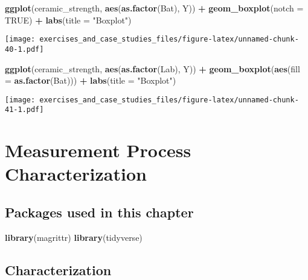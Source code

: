 \documentclass[]{book}
\newenvironment{Shaded}{\begin{snugshade}}{\end{snugshade}}
\newcommand{\DataTypeTok}[1]{\textcolor[rgb]{0.13,0.29,0.53}{#1}}
\newcommand{\KeywordTok}[1]{\textcolor[rgb]{0.13,0.29,0.53}{\textbf{#1}}}
\newcommand{\NormalTok}[1]{#1}
\newcommand{\OperatorTok}[1]{\textcolor[rgb]{0.81,0.36,0.00}{\textbf{#1}}}
\newcommand{\OtherTok}[1]{\textcolor[rgb]{0.56,0.35,0.01}{#1}}
\newcommand{\StringTok}[1]{\textcolor[rgb]{0.31,0.60,0.02}{#1}}
\theoremstyle{definition}
\theoremstyle{definition}
\theoremstyle{definition}
\theoremstyle{remark}
\begin{document}
\begin{Shaded}
\begin{Highlighting}[]
\KeywordTok{ggplot}\NormalTok{(ceramic_strength, }\KeywordTok{aes}\NormalTok{(}\KeywordTok{as.factor}\NormalTok{(Bat), Y)) }\OperatorTok{+}
\StringTok{  }\KeywordTok{geom_boxplot}\NormalTok{(}\DataTypeTok{notch =} \OtherTok{TRUE}\NormalTok{) }\OperatorTok{+}
\StringTok{  }\KeywordTok{labs}\NormalTok{(}\DataTypeTok{title =} \StringTok{"Boxplot"}\NormalTok{)}
\end{Highlighting}
\end{Shaded}

\texttt{[image: exercises\_and\_case\_studies\_files/figure-latex/unnamed-chunk-40-1.pdf]}

\begin{Shaded}
\begin{Highlighting}[]
\KeywordTok{ggplot}\NormalTok{(ceramic_strength, }\KeywordTok{aes}\NormalTok{(}\KeywordTok{as.factor}\NormalTok{(Lab), Y)) }\OperatorTok{+}
\StringTok{  }\KeywordTok{geom_boxplot}\NormalTok{(}\KeywordTok{aes}\NormalTok{(}\DataTypeTok{fill =} \KeywordTok{as.factor}\NormalTok{(Bat))) }\OperatorTok{+}
\StringTok{  }\KeywordTok{labs}\NormalTok{(}\DataTypeTok{title =} \StringTok{"Boxplot"}\NormalTok{)}
\end{Highlighting}
\end{Shaded}

\texttt{[image: exercises\_and\_case\_studies\_files/figure-latex/unnamed-chunk-41-1.pdf]}

\hypertarget{measurement-process-characterization}{%
\chapter{Measurement Process
Characterization}\label{measurement-process-characterization}}

\hypertarget{packages-used-in-this-chapter}{%
\section{Packages used in this
chapter}\label{packages-used-in-this-chapter}}

\begin{Shaded}
\begin{Highlighting}[]
\KeywordTok{library}\NormalTok{(magrittr)}
\KeywordTok{library}\NormalTok{(tidyverse)}
\end{Highlighting}
\end{Shaded}

\hypertarget{characterization}{%
\section{Characterization}\label{characterization}}
\end{document}
